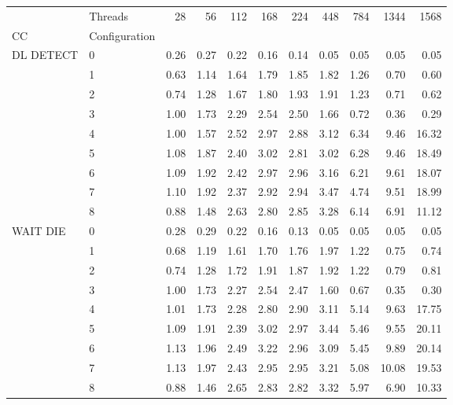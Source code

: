 \begin{tabular}{llrrrrrrrrr}
\toprule
       & Threads &  28   &  56   &  112  &  168  &  224  &  448  &  784  &  1344 &  1568 \\
CC & Configuration &       &       &       &       &       &       &       &       &       \\
\midrule
DL DETECT & 0 &  0.26 &  0.27 &  0.22 &  0.16 &  0.14 &  0.05 &  0.05 &  0.05 &  0.05 \\
       & 1 &  0.63 &  1.14 &  1.64 &  1.79 &  1.85 &  1.82 &  1.26 &  0.70 &  0.60 \\
       & 2 &  0.74 &  1.28 &  1.67 &  1.80 &  1.93 &  1.91 &  1.23 &  0.71 &  0.62 \\
       & 3 &  1.00 &  1.73 &  2.29 &  2.54 &  2.50 &  1.66 &  0.72 &  0.36 &  0.29 \\
       & 4 &  1.00 &  1.57 &  2.52 &  2.97 &  2.88 &  3.12 &  6.34 &  9.46 & 16.32 \\
       & 5 &  1.08 &  1.87 &  2.40 &  3.02 &  2.81 &  3.02 &  6.28 &  9.46 & 18.49 \\
       & 6 &  1.09 &  1.92 &  2.42 &  2.97 &  2.96 &  3.16 &  6.21 &  9.61 & 18.07 \\
       & 7 &  1.10 &  1.92 &  2.37 &  2.92 &  2.94 &  3.47 &  4.74 &  9.51 & 18.99 \\
       & 8 &  0.88 &  1.48 &  2.63 &  2.80 &  2.85 &  3.28 &  6.14 &  6.91 & 11.12 \\
WAIT DIE & 0 &  0.28 &  0.29 &  0.22 &  0.16 &  0.13 &  0.05 &  0.05 &  0.05 &  0.05 \\
       & 1 &  0.68 &  1.19 &  1.61 &  1.70 &  1.76 &  1.97 &  1.22 &  0.75 &  0.74 \\
       & 2 &  0.74 &  1.28 &  1.72 &  1.91 &  1.87 &  1.92 &  1.22 &  0.79 &  0.81 \\
       & 3 &  1.00 &  1.73 &  2.27 &  2.54 &  2.47 &  1.60 &  0.67 &  0.35 &  0.30 \\
       & 4 &  1.01 &  1.73 &  2.28 &  2.80 &  2.90 &  3.11 &  5.14 &  9.63 & 17.75 \\
       & 5 &  1.09 &  1.91 &  2.39 &  3.02 &  2.97 &  3.44 &  5.46 &  9.55 & 20.11 \\
       & 6 &  1.13 &  1.96 &  2.49 &  3.22 &  2.96 &  3.09 &  5.45 &  9.89 & 20.14 \\
       & 7 &  1.13 &  1.97 &  2.43 &  2.95 &  2.95 &  3.21 &  5.08 & 10.08 & 19.53 \\
       & 8 &  0.88 &  1.46 &  2.65 &  2.83 &  2.82 &  3.32 &  5.97 &  6.90 & 10.33 \\

\end{tabular}
